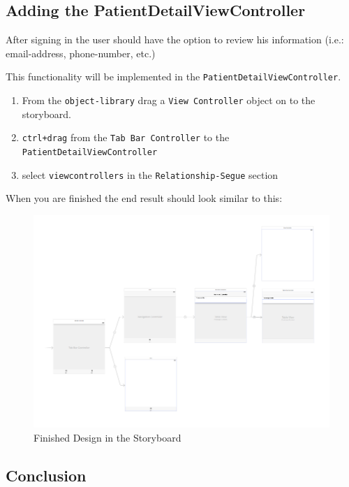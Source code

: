 \documentclass{article}
\begin{document}
\subsection{Adding the PatientDetailViewController}\label{adding-the-patientdetailviewcontroller}

After signing in the user should have the option to review his
information (i.e.: email-address, phone-number, etc.)

This functionality will be implemented in the
\texttt{PatientDetailViewController}.

\begin{enumerate}
\def\labelenumi{\arabic{enumi}.}

\item
  From the \texttt{object-library} drag a \texttt{View\ Controller}
  object on to the storyboard.
\item
  \texttt{ctrl+drag} from the \texttt{Tab\ Bar\ Controller} to the
  \texttt{PatientDetailViewController}
\item
  select \texttt{viewcontrollers} in the \texttt{Relationship-Segue}
  section
\end{enumerate}

When you are finished the end result should look similar to this:


\begin{figure}[H]
\centering
\includegraphics[width=\linewidth]{resources/step4/end-result.png}
\caption{Finished Design in the Storyboard}
\label{fig:storyboard-finished}
\end{figure}

\subsection{Conclusion}\label{step4:conclusion}
\end{document}
